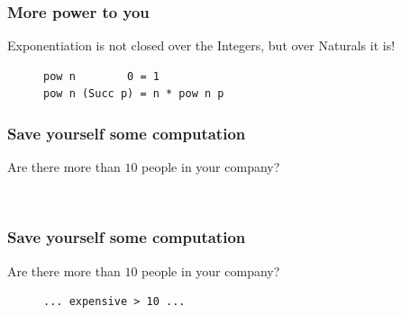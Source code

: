 \documentclass{beamer}
\begin{document}
  \begin{frame}[fragile]
    \frametitle{More power to you}
    Exponentiation is not closed over the Integers, but over Naturals it is!
    \begin{figure}
    {\color{dark-gray}
      \centering
\begin{BVerbatim}
pow n        0 = 1
pow n (Succ p) = n * pow n p
\end{BVerbatim}
    }
    \end{figure}
  \end{frame}
  \begin{frame}[fragile]
    \frametitle{Save yourself some computation}
    Are there more than $10$ people in your company?
    \begin{figure}
    {\color{dark-gray}
      \centering
\begin{BVerbatim}
                       
\end{BVerbatim}
    }
    \end{figure}
  \end{frame}
  \begin{frame}[fragile]
    \frametitle{Save yourself some computation}
    Are there more than $10$ people in your company?
    \begin{figure}
    {\color{dark-gray}
      \centering
\begin{BVerbatim}
... expensive > 10 ...
\end{BVerbatim}
    }
    \end{figure}
  \end{frame}

\end{document}
